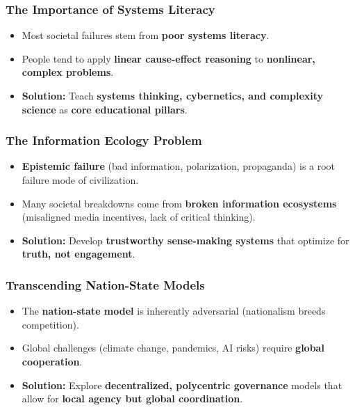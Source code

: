 \begin{frame}[fragile]\frametitle{The Importance of Systems Literacy}
	\begin{itemize}
	\item Most societal failures stem from \textbf{poor systems literacy}.
	\item People tend to apply \textbf{linear cause-effect reasoning} to \textbf{nonlinear, complex problems}.
	\item \textbf{Solution:} Teach \textbf{systems thinking, cybernetics, and complexity science} as \textbf{core educational pillars}.
	\end{itemize}
\end{frame}

\begin{frame}[fragile]\frametitle{The Information Ecology Problem}
	\begin{itemize}
	\item \textbf{Epistemic failure} (bad information, polarization, propaganda) is a root failure mode of civilization.
	\item Many societal breakdowns come from \textbf{broken information ecosystems} (misaligned media incentives, lack of critical thinking).
	\item \textbf{Solution:} Develop \textbf{trustworthy sense-making systems} that optimize for \textbf{truth, not engagement}.
	\end{itemize}
\end{frame}

\begin{frame}[fragile]\frametitle{Transcending Nation-State Models}
	\begin{itemize}
	\item The \textbf{nation-state model} is inherently adversarial (nationalism breeds competition).
	\item Global challenges (climate change, pandemics, AI risks) require \textbf{global cooperation}.
	\item \textbf{Solution:} Explore \textbf{decentralized, polycentric governance} models that allow for \textbf{local agency but global coordination}.
	\end{itemize}
\end{frame}

